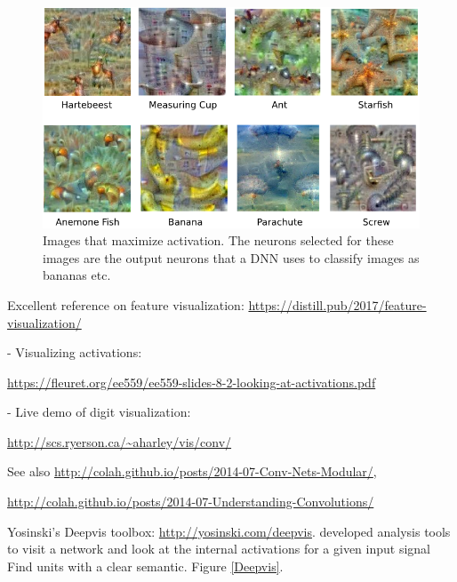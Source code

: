 \documentclass[english]{article}
\begin{document}
\begin{figure}
  \centering
  \includegraphics[scale=0.7]{vis.png}
    \caption{Images that maximize activation. The neurons selected for these images are the output neurons that a DNN uses to classify images as bananas etc.}
    \label{vis}
\end{figure}

\item Excellent reference on feature visualization: \url{https://distill.pub/2017/feature-visualization/}

- Visualizing activations: 

\url{https://fleuret.org/ee559/ee559-slides-8-2-looking-at-activations.pdf}


- Live demo of digit visualization: 

\url{http://scs.ryerson.ca/~aharley/vis/conv/}


\item See also \url{http://colah.github.io/posts/2014-07-Conv-Nets-Modular/}, 

\url{http://colah.github.io/posts/2014-07-Understanding-Convolutions/}

Yosinski's Deepvis toolbox: \url{http://yosinski.com/deepvis}. developed analysis tools to visit a network and look at the
internal activations for a given input signal Find units with a clear semantic. Figure \ref{Deepvis}.
\end{document}
